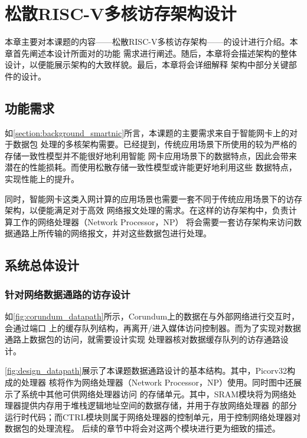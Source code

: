 \section{松散RISC-V多核访存架构设计}

本章主要对本课题的内容——松散RISC-V多核访存架构——的设计进行介绍。本章首先阐述本设计所面对的功能
需求进行阐述。随后，本章将会描述架构的整体设计，以便能展示架构的大致样貌。最后，本章将会详细解释
架构中部分关键部件的设计。

\subsection{功能需求}
\label{section:design_need}

如\autoref{section:background_smartnic}所言，本课题的主要需求来自于智能网卡上的对于数据包
处理的多核架构需要。已经提到，传统应用场景下所使用的较为严格的存储一致性模型并不能很好地利用智能
网卡应用场景下的数据特点，因此会带来潜在的性能损耗。而使用松散存储一致性模型或许能更好地利用这些
数据特点，实现性能上的提升。

同时，智能网卡这类入网计算的应用场景也需要一套不同于传统应用场景下的访存架构，以便能满足对于高效
网络报文处理的需求。在这样的访存架构中，负责计算工作的网络处理器（Network Processor，NP）
将会需要一套访存架构来访问数据通路上所传输的网络报文，并对这些数据包进行处理。

\subsection{系统总体设计}
\label{section:design_overview}

\subsubsection{针对网络数据通路的访存设计}

如\autoref{fig:corundum_datapath}所示，Corundum上的数据在与外部网络进行交互时，会通过端口
上的缓存队列结构，再离开/进入媒体访问控制器。而为了实现对数据通路上数据包的访问，就需要设计实现
处理器核对数据缓存队列的访存通路设计。


\autoref{fig:design_datapath}展示了本课题数据通路设计的基本结构。其中，Picorv32构成的处理器
核将作为网络处理器（Network Processor，NP）使用。同时图中还展示了系统中其他可供网络处理器访问
的存储单元。其中，SRAM模块将为网络处理器提供内存用于堆栈逻辑地址空间的数据存储，并用于存放网络处理器
的部分运行时代码；而CTRL模块则属于网络处理器的控制单元，用于控制网络处理器对数据包的处理流程。
后续的章节中将会对这两个模块进行更为细致的描述。

